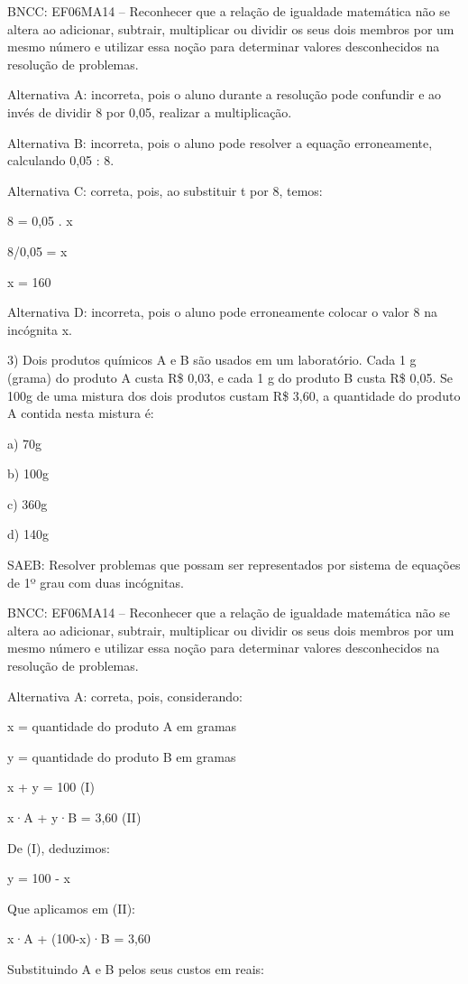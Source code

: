 BNCC: EF06MA14 -- Reconhecer que a relação de igualdade matemática não
se altera ao adicionar, subtrair, multiplicar ou dividir os seus dois
membros por um mesmo número e utilizar essa noção para determinar
valores desconhecidos na resolução de problemas.

Alternativa A: incorreta, pois o aluno durante a resolução pode
confundir e ao invés de dividir 8 por 0,05, realizar a multiplicação.

Alternativa B: incorreta, pois o aluno pode resolver a equação
erroneamente, calculando 0,05 : 8.

Alternativa C: correta, pois, ao substituir t por 8, temos:

8 = 0,05 . x

8/0,05 = x

x = 160

Alternativa D: incorreta, pois o aluno pode erroneamente colocar o valor
8 na incógnita x.

3) Dois produtos químicos A e B são usados em um laboratório. Cada 1 g
(grama) do produto A custa R\$ 0,03, e cada 1 g do produto B custa R\$
0,05. Se 100g de uma mistura dos dois produtos custam R\$ 3,60, a
quantidade do produto A contida nesta mistura é:

a) 70g

b) 100g

c) 360g

d) 140g

SAEB: Resolver problemas que possam ser representados por sistema de
equações de 1º grau com duas incógnitas.

BNCC: EF06MA14 -- Reconhecer que a relação de igualdade matemática não
se altera ao adicionar, subtrair, multiplicar ou dividir os seus dois
membros por um mesmo número e utilizar essa noção para determinar
valores desconhecidos na resolução de problemas.

Alternativa A: correta, pois, considerando:

x = quantidade do produto A em gramas

y = quantidade do produto B em gramas

x + y = 100 (I)

x·A + y·B = 3,60 (II)

De (I), deduzimos:

y = 100 - x

Que aplicamos em (II):

x·A + (100-x)·B = 3,60

Substituindo A e B pelos seus custos em reais:

